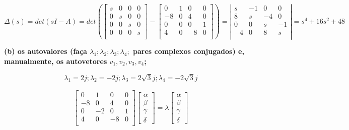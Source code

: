 \documentclass[11pt]{article}
\begin{document}
\[
\Delta(s) = det(sI - A) = det\left(
\left[ {\begin{array}{cccc}
  s & 0 & 0 & 0 \\
  0 & s & 0 & 0 \\
  0 & 0 & s & 0 \\
  0 & 0 & 0 & s \\
\end{array} } \right]
-
\left[ {\begin{array}{cccc}
  0 & 1 & 0 & 0 \\
  -8 & 0 & 4 & 0 \\
  0 & 0 & 0 & 1 \\
  4 & 0 & -8 & 0 \\
  \end{array} } \right]
  \right)
  =
  \left| \begin{array}{cccc}
    s & -1  & 0 &  0\\ 
    8 & s & -4 & 0 \\
    0 & 0  & s & -1 \\
    -4 & 0  & 8 & s \\
  \end{array}
  \right|
  = s^4 + 16s^2 + 48
\]

\textbf{(b) os autovalores (faça $\lambda_1; \lambda_2; \lambda_3; \lambda_4;$ pares complexos conjugados) e, manualmente, os autovetores $v_1, v_2, v_3, v_4$;}

\[
  \lambda_1 = 2j; \lambda_2 = -2j; \lambda_3 = 2\sqrt{3}j; \lambda_4 = -2\sqrt{3}j
\]

\begin{align*}
  \begin{bmatrix}
    0 & 1 & 0 & 0 \\
    -8 & 0 & 4 & 0 \\
    0 & -2 & 0 & 1 \\
    4 & 0 & -8 & 0 \\
  \end{bmatrix}
  \begin{bmatrix}
    \alpha\\
    \beta\\
    \gamma\\
    \delta
  \end{bmatrix}
  =
  \lambda
  \begin{bmatrix}
    \alpha\\
    \beta\\
    \gamma\\
    \delta
  \end{bmatrix}
\end{align*}
\end{document}
